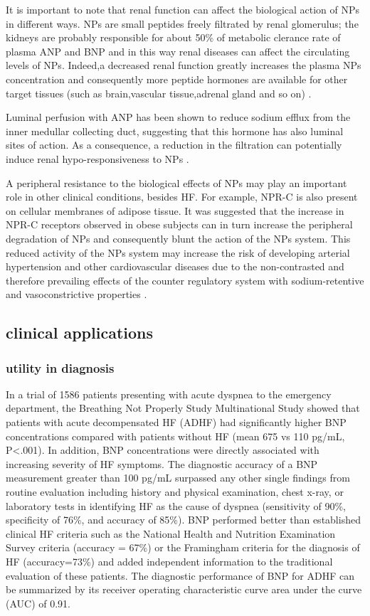 \documentclass[14pt,a4paper,onecolumn]{extarticle}
\begin{document}
It is important to note that renal function can affect the biological action of NPs in different ways.  NPs are small peptides freely filtrated by renal glomerulus; the kidneys are probably responsible for about 50\% of metabolic clerance rate of plasma ANP and BNP and in this way renal diseases can affect the circulating levels of NPs.  Indeed,a decreased renal function greatly increases the plasma NPs concentration and consequently more peptide hormones are available for other target tissues (such as brain,vascular tissue,adrenal gland and so on) \citep{bib35}. %

Luminal perfusion with ANP has been shown to reduce sodium efflux from the inner medullar collecting duct, suggesting that this hormone has also luminal sites of action.  As a consequence, a reduction in the filtration can potentially induce renal hypo-responsiveness to NPs \citep{bib325}. %

A peripheral resistance to the biological effects of NPs may play an important role in other clinical conditions, besides HF. For example, NPR-C is also present on cellular membranes of adipose tissue. It was suggested that the increase in NPR-C receptors observed in obese subjects can in turn increase the peripheral degradation of NPs and consequently blunt the action of the NPs system. This reduced activity of the NPs system may increase the risk of developing arterial hypertension and other cardiovascular diseases due to the non-contrasted and therefore prevailing effects of the counter regulatory system with sodium-retentive and vasoconstrictive properties \citep{bib352}. %

\subsection{clinical applications}
\subsubsection{utility in diagnosis}

In a trial of 1586 patients presenting with acute dyspnea to the emergency department, the Breathing Not Properly Study Multinational Study showed that patients with acute decompensated HF (ADHF) had significantly higher BNP concentrations compared with patients without HF (mean 675  vs 110  pg/mL, P<.001). In addition, BNP concentrations were directly associated with increasing severity of HF symptoms. The diagnostic accuracy of a BNP measurement greater than 100 pg/mL surpassed any other single findings from routine evaluation including history and physical examination, chest x-ray, or laboratory tests in identifying HF as the cause of dyspnea (sensitivity of 90\%, specificity of 76\%, and accuracy of 85\%). BNP performed better than established clinical HF criteria such as the National Health and Nutrition Examination Survey criteria (accuracy = 67\%) or the Framingham criteria for the diagnosis of HF (accuracy=73\%) and added independent information to the traditional evaluation of these patients. The diagnostic performance of BNP for ADHF can be summarized by its receiver operating characteristic curve area under the curve (AUC) of 0.91. \citep{Maisel2002}
\end{document}
